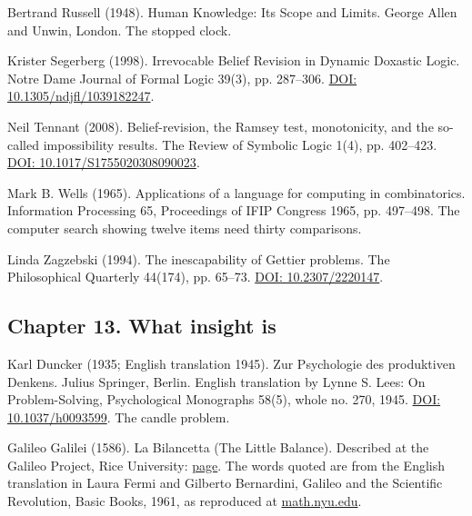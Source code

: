 \documentclass[11pt,twoside]{article}
\theoremstyle{thielethm}
\theoremstyle{thieledef}
\theoremstyle{thieledef}
\theoremstyle{thieledef}
\theoremstyle{thielethm}
\theoremstyle{thieleobs}
\theoremstyle{thielethm}
\begin{document}
\noindent Bertrand Russell (1948). Human Knowledge: Its Scope and Limits. George Allen and Unwin, London. The stopped clock.
\par\medskip

\noindent Krister Segerberg (1998). Irrevocable Belief Revision in Dynamic Doxastic Logic. Notre Dame Journal of Formal Logic 39(3), pp. 287--306. \href{https://doi.org/10.1305/ndjfl/1039182247}{DOI: 10.1305/ndjfl/1039182247}.
\par\medskip

\noindent Neil Tennant (2008). Belief-revision, the Ramsey test, monotonicity, and the so-called impossibility results. The Review of Symbolic Logic 1(4), pp. 402--423. \href{https://doi.org/10.1017/S1755020308090023}{DOI: 10.1017/S1755020308090023}.
\par\medskip

\noindent Mark B. Wells (1965). Applications of a language for computing in combinatorics. Information Processing 65, Proceedings of IFIP Congress 1965, pp. 497--498. The computer search showing twelve items need thirty comparisons.
\par\medskip

\noindent Linda Zagzebski (1994). The inescapability of Gettier problems. The Philosophical Quarterly 44(174), pp. 65--73. \href{https://doi.org/10.2307/2220147}{DOI: 10.2307/2220147}.
\par\medskip

\subsection*{Chapter 13. What insight is}

\noindent Karl Duncker (1935; English translation 1945). Zur Psychologie des produktiven Denkens. Julius Springer, Berlin. English translation by Lynne S. Lees: On Problem-Solving, Psychological Monographs 58(5), whole no. 270, 1945. \href{https://doi.org/10.1037/h0093599}{DOI: 10.1037/h0093599}. The candle problem.
\par\medskip

\noindent Galileo Galilei (1586). La Bilancetta (The Little Balance). Described at the Galileo Project, Rice University: \href{https://galileo.library.rice.edu/sci/instruments/balance.html}{page}. The words quoted are from the English translation in Laura Fermi and Gilberto Bernardini, Galileo and the Scientific Revolution, Basic Books, 1961, as reproduced at \href{https://math.nyu.edu/Archimedes/Crown/bilancetta.html}{math.nyu.edu}.
\par\medskip
\end{document}
